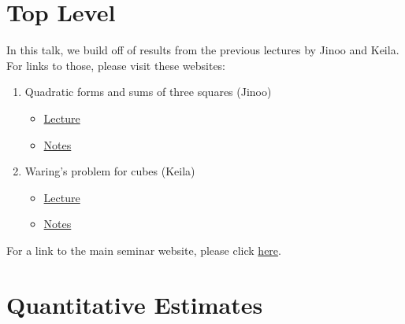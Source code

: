 \documentclass[8pt]{extarticle}
\begin{document}
\section{Top Level}
In this talk, we build off of results from the previous lectures by Jinoo and Keila. For links to those, please visit these websites:
\begin{enumerate}
    \item Quadratic forms and sums of three squares	(Jinoo)
    \begin{itemize}
        \item \href{https://www.math.columbia.edu/~avizeff/additive/slides_1.pdf}{Lecture}
        \item \href{https://www.math.columbia.edu/~avizeff/additive/talk_1.pdf}{Notes}
    \end{itemize}
    \item Waring's problem for cubes (Keila)
    \begin{itemize}
        \item \href{https://columbiauniversity.zoom.us/rec/play/gU4lN9UJrLJeZoBgZbAqbsK44wzYHKJNZtP6k3ErolHShs-1IQnFnA-OMJTGxuriCBgKegFg94M-WV6x.HRxLAP5iqhDf8auU?canPlayFromShare=true&from=my_recording&continueMode=true&componentName=rec-play&originRequestUrl=https%3A%2F%2Fcolumbiauniversity.zoom.us%2Frec%2Fshare%2FlpBYukN1XkIGsG9WVN0u7t5TRrISo5aLPDYSWg-lDxi2wqzO97vefWqWSpI46wRf.Qhmaw7AjQ9XESgOo}{Lecture}
        \item \href{https://www.math.columbia.edu/~avizeff/additive/talk_2.pdf}{Notes}
    \end{itemize}
\end{enumerate}
For a link to the main seminar website, please click \href{https://www.math.columbia.edu/~avizeff/additive/index.html}{here}.
\section{Quantitative Estimates}
\end{document}

